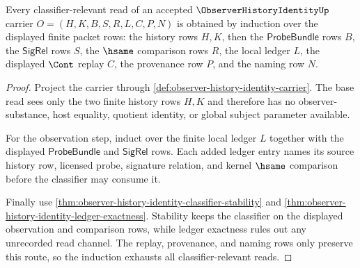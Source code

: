 \begin{theorem}
\label{thm:observer-history-identity-bhist-induction}
Every classifier-relevant read of an accepted $\ObserverHistoryIdentityUp$ carrier $O=(H,K,B,S,R,L,C,P,N)$ is obtained by induction over the displayed finite packet rows: the history rows $H,K$, then the $\mathsf{ProbeBundle}$ rows $B$, the $\mathsf{SigRel}$ rows $S$, the $\hsame$ comparison rows $R$, the local ledger $L$, the displayed $\Cont$ replay $C$, the provenance row $P$, and the naming row $N$.
\end{theorem}
\begin{proof}
Project the carrier through \autoref{def:observer-history-identity-carrier}. The base read sees only the two finite history rows $H,K$ and therefore has no observer-substance, host equality, quotient identity, or global subject parameter available.

For the observation step, induct over the finite local ledger $L$ together with the displayed $\mathsf{ProbeBundle}$ and $\mathsf{SigRel}$ rows. Each added ledger entry names its source history row, licensed probe, signature relation, and kernel $\hsame$ comparison before the classifier may consume it.

Finally use \autoref{thm:observer-history-identity-classifier-stability} and \autoref{thm:observer-history-identity-ledger-exactness}. Stability keeps the classifier on the displayed observation and comparison rows, while ledger exactness rules out any unrecorded read channel. The replay, provenance, and naming rows only preserve this route, so the induction exhausts all classifier-relevant reads.
\end{proof}

